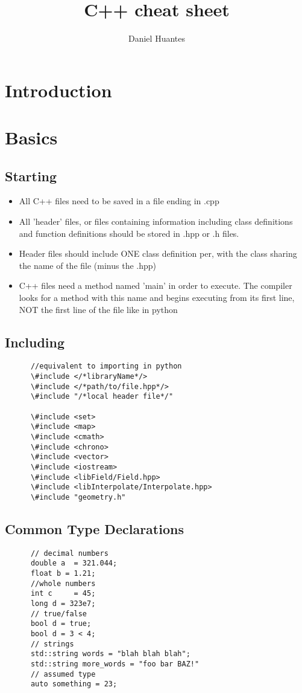 \documentclass[12pt]{article}
\begin{document}
\title{C++ cheat sheet}
\author{Daniel Huantes}
\maketitle
\section{Introduction}

\section{Basics}
  \subsection{Starting}
    \begin{itemize}
      \item All C++ files need to be saved in a file ending in .cpp
      \item All 'header' files, or files containing information
      including class definitions and function definitions should be
      stored in .hpp or .h files.
      \item Header files should include ONE class definition per, with
      the class sharing the name of the file (minus the .hpp)
      \item C++ files need a method named 'main' in order to
      execute. The compiler looks for a method with this name and
      begins executing from its first line, NOT the first line of the
      file like in python
    \end{itemize}
  \subsection{Including}
    \begin{lstlisting}
      //equivalent to importing in python
      \#include </*libraryName*/>
      \#include </*path/to/file.hpp*/>
      \#include "/*local header file*/"

      \#include <set>
      \#include <map>
      \#include <cmath>
      \#include <chrono>
      \#include <vector>
      \#include <iostream>
      \#include <libField/Field.hpp>
      \#include <libInterpolate/Interpolate.hpp>
      \#include "geometry.h"

    \end{lstlisting}
  \subsection{Common Type Declarations}
    \begin{lstlisting}
      // decimal numbers
      double a  = 321.044; 
      float b = 1.21;
      //whole numbers
      int c     = 45;
      long d = 323e7;  
      // true/false
      bool d = true;
      bool d = 3 < 4;
      // strings
      std::string words = "blah blah blah";
      std::string more_words = "foo bar BAZ!"
      // assumed type
      auto something = 23;
    \end{lstlisting}
\end{document}

